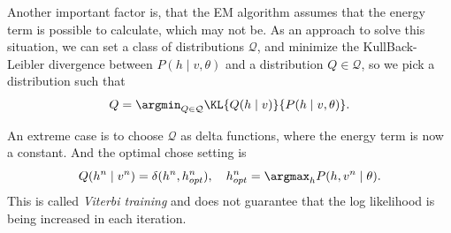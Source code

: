 Another important factor is, that the EM algorithm assumes that the energy term is possible to calculate, which may not be. As an approach to solve this situation, we can set a class of distributions \(\mathcal{Q}\), and minimize the KullBack-Leibler divergence between \(P(h \mid v, \theta)\) and a distribution \(Q \in \mathcal{Q}\), so we pick a distribution such that
\[
  Q = \argmin_{Q \in \mathcal{Q}} \KL{Q(h \mid v)}{P(h\mid v, \theta)}.
\]

An extreme case is to choose \(\mathcal{Q}\) as delta functions, where the energy term is now a constant. And the optimal chose setting is
\[
Q(h^{n} \mid v^{n}) = \delta (h^{n}, h^{n}_{opt}) , \quad h^{n}_{opt} = \argmax_{h}P(h , v^{n} \mid \theta).
\]
This is called \emph{Viterbi training} and does not guarantee that the log likelihood is being increased in each iteration.
